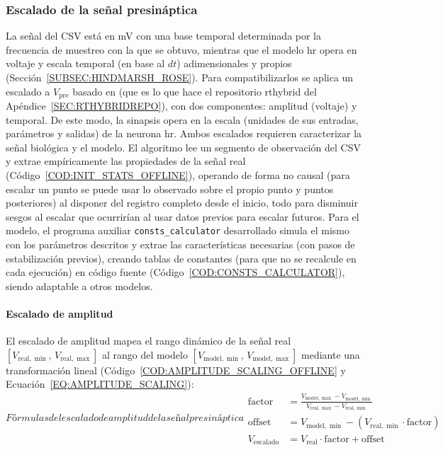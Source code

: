 \subsubsection{Escalado de la señal presináptica\label{SUBSUBSEC:ESCALADO}}

La señal del CSV está en mV con una base temporal determinada por la frecuencia de muestreo con la que se obtuvo, mientras que el modelo \ac{hr} opera en voltaje y escala temporal (en base al $dt$) adimensionales y propios (Sección~\ref{SUBSEC:HINDMARSH_ROSE}). Para compatibilizarlos se aplica un escalado a $V_{\mathrm{pre}}$ basado en \cite{Reyes-Sanchez2020} (que es lo que hace el repositorio \ac{rthybrid} del Apéndice~\ref{SEC:RTHYBRIDREPO}), con dos componentes: amplitud (voltaje) y temporal. De este modo, la sinapsis opera en la escala (unidades de sus entradas, parámetros y salidas) de la neurona \ac{hr}. Ambos escalados requieren caracterizar la señal biológica y el modelo. El algoritmo lee un segmento de observación del CSV y extrae empíricamente las propiedades de la señal real (Código~\ref{COD:INIT_STATS_OFFLINE}), operando de forma no causal (para escalar un punto se puede usar lo observado sobre el propio punto y puntos posteriores) al disponer del registro completo desde el inicio, todo para disminuir sesgos al escalar que ocurrirían al usar datos previos para escalar futuros. Para el modelo, el programa auxiliar \texttt{consts\_calculator} desarrollado simula el mismo con los parámetros descritos y extrae las características necesarias (con pasos de estabilización previos), creando tablas de constantes (para que no se recalcule en cada ejecución) en código fuente (Código~\ref{COD:CONSTS_CALCULATOR}), siendo adaptable a otros modelos.

\paragraph{Escalado de amplitud}

El escalado de amplitud mapea el rango dinámico de la señal real $[V_{\mathrm{real,}\min},\, V_{\mathrm{real,}\max}]$ al rango del modelo $[V_{\mathrm{model,}\min},\, V_{\mathrm{model,}\max}]$ mediante una transformación lineal (Código~\ref{COD:AMPLITUDE_SCALING_OFFLINE} y Ecuación~\ref{EQ:AMPLITUDE_SCALING}):
\begin{equation}[EQ:AMPLITUDE_SCALING]{Fórmulas del escalado de amplitud de la señal presináptica}
    \begin{aligned}
        \mathrm{factor}       & = \frac{V_{\mathrm{model,}\max} - V_{\mathrm{model,}\min}}{V_{\mathrm{real,}\max} - V_{\mathrm{real,}\min}} \\
        \mathrm{offset}       & = V_{\mathrm{model,}\min} - (V_{\mathrm{real,}\min} \cdot \mathrm{factor})                                  \\
        V_{\mathrm{escalado}} & = V_{\mathrm{real}} \cdot \mathrm{factor} + \mathrm{offset}
    \end{aligned}
\end{equation}

